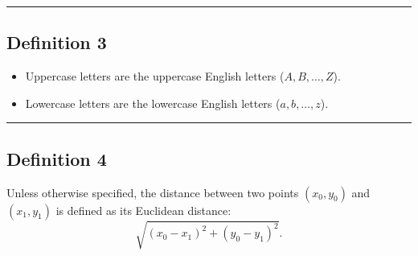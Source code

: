 \documentclass[noproblemids,a4paper]{problemset}
\begin{document}
\vskip 20pt
\hrule
\vskip 20pt

\subsection*{Definition 3}

\begin{itemize}
	\item Uppercase letters are the uppercase English letters ($A, B, \dots , Z$).
	\item Lowercase letters are the lowercase English letters ($a, b, \dots , z$).
\end{itemize}

\vskip 20pt
\hrule
\vskip 20pt

\subsection*{Definition 4}

Unless otherwise specified, the distance between two points $(x_0, y_0)$ and $(x_1, y_1)$ is defined as its Euclidean distance: $$\sqrt{(x_0-x_1)^2 + (y_0-y_1)^2}.$$

\end{document}

